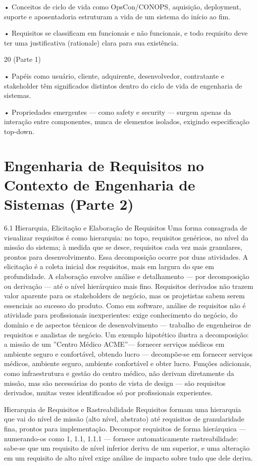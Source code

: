 • Conceitos de ciclo de vida como OpsCon/CONOPS, aquisição, deployment, suporte e aposentadoria estruturam a vida de um sistema do início ao fim.

• Requisitos se classificam em funcionais e não funcionais, e todo requisito deve ter uma justificativa (rationale) clara para sua existência.

20 (Parte 1)

• Papéis como usuário, cliente, adquirente, desenvolvedor, contratante e stakeholder têm significados distintos dentro do ciclo de vida de engenharia de sistemas.

• Propriedades emergentes — como safety e security — surgem apenas da interação entre componentes, nunca de elementos isolados, exigindo especificação top-down.

\chapter{Engenharia de Requisitos no Contexto de Engenharia de Sistemas (Parte 2)}

6.1 Hierarquia, Elicitação e Elaboração de Requisitos Uma forma consagrada de visualizar requisitos é como hierarquia: no topo, requisitos genéricos, no nível da missão do sistema; à medida que se desce, requisitos cada vez mais granulares, prontos para desenvolvimento. Essa decomposição ocorre por duas atividades. A elicitação é a coleta inicial dos requisitos, mais em largura do que em profundidade. A elaboração envolve análise e detalhamento — por decomposição ou derivação — até o nível hierárquico mais fino. Requisitos derivados não trazem valor aparente para os stakeholders de negócio, mas os projetistas sabem serem essenciais ao sucesso do produto. Como em software, análise de requisitos não é atividade para profissionais inexperientes: exige conhecimento do negócio, do domínio e de aspectos técnicos de desenvolvimento — trabalho de engenheiros de requisitos e analistas de negócio. Um exemplo hipotético ilustra a decomposição: a missão de um ”Centro Médico ACME”— fornecer serviços médicos em ambiente seguro e confortável, obtendo lucro — decompõe-se em fornecer serviços médicos, ambiente seguro, ambiente confortável e obter lucro. Funções adicionais, como infraestrutura e gestão do centro médico, não derivam diretamente da missão, mas são necessárias do ponto de vista de design — são requisitos derivados, muitas vezes identificados só por profissionais experientes.

Hierarquia de Requisitos e Rastreabilidade Requisitos formam uma hierarquia que vai do nível de missão (alto nível, abstrato) até requisitos de granularidade fina, prontos para implementação. Decompor requisitos de forma hierárquica — numerando-os como 1, 1.1, 1.1.1 — fornece automaticamente rastreabilidade: sabe-se que um requisito de nível inferior deriva de um superior, e uma alteração em um requisito de alto nível exige análise de impacto sobre tudo que dele deriva.

